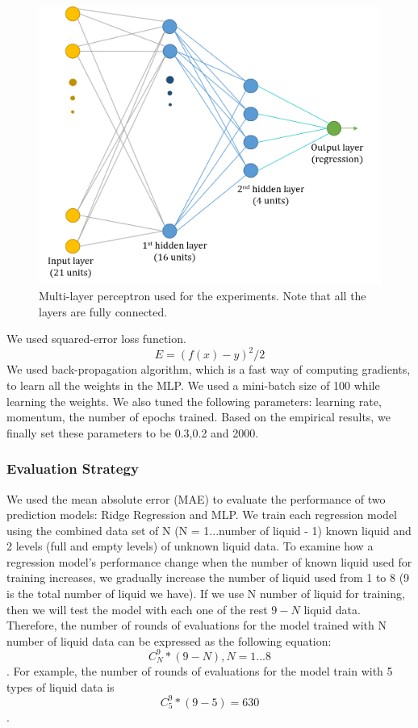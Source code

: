 \documentclass{article} %
\begin{document}
\begin{figure}[tbh]
\centering
\includegraphics[width=0.75\linewidth]{network.png}
\caption{Multi-layer perceptron used for the experiments. Note that all the layers are fully connected.}
\label{fig:network}
\end{figure}
We used squared-error loss function.\begin{equation} E=(f(x)-y)^2/2\end{equation} We used back-propagation algorithm, which is a fast way of computing gradients, to learn all the weights in the MLP. We used a mini-batch size of 100 while learning the weights. We also tuned the following parameters: learning rate, momentum, the number of epochs trained. Based on the empirical results, we finally set these parameters to be 0.3,0.2 and 2000.


\subsubsection{Evaluation Strategy}
We used the mean absolute error (MAE) to evaluate the performance of two prediction models: Ridge Regression and MLP. We train each regression model using the combined data set of N (N = 1...number of liquid - 1) known liquid and 2 levels (full and empty levels) of unknown liquid data. To examine how a regression model's performance change when the number of known liquid used for training increases, we gradually increase the number of liquid used from 1 to 8 (9 is the total number of liquid we have). If we use N number of liquid for training, then we will test the model with each one of the rest $9-N$ liquid data. Therefore, the number of rounds of evaluations for the model trained with N number of liquid data can be expressed as the following equation: \[C^9_N * (9-N), N = 1...8\]. For example, the number of rounds of evaluations for the model train with 5 types of liquid data is \[C^9_5 * (9-5) = 630\].     
\end{document}
